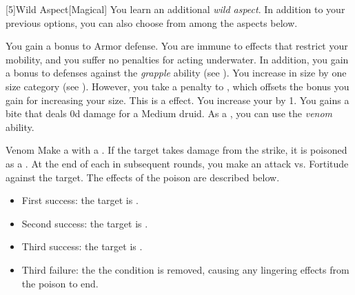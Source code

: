         [5]{Wild Aspect}[Magical]
        You learn an additional \textit{wild aspect}.
        In addition to your previous options, you can also choose from among the aspects below.
        {
             You gain a  bonus to Armor defense.
             You are immune to effects that restrict your mobility, and you suffer no penalties for acting underwater.
            In addition, you gain a  bonus to defenses against the \textit{grapple} ability (see ).
            You increase in size by one size category (see ).
            However, you take a  penalty to , which offsets the bonus you gain for increasing your size.
            This is a  effect.
            You increase your  by 1.
            You gains a bite  that deals \plus0d damage for a Medium druid.
            As a , you can use the \textit{venom} ability.
            \begin{ability}{Venom}
                Make a  with a .
                If the target takes damage from the strike, it is poisoned as a .
                At the end of each  in subsequent rounds, you make an attack vs. Fortitude against the target.
                The effects of the poison are described below.
                \begin{itemize}
                    \item First success: the target is \sickened.
                    \item Second success: the target is \nauseated.
                    \item Third success: the target is \paralyzed.
                    \item Third failure: the the condition is removed, causing any lingering effects from the poison to end.
                \end{itemize}
            \end{ability}
        }

